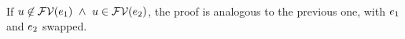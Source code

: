 \begin{bycase}
\begin{derivatioN}{4}
{ 
  \cup
   \cond{\varII\in\efvar{\exprI}}
        {\cup\cvarv{\exprI}{\varII}}
        {\emptyset}
    \cup\\
 \linK{=}
 \cond{\varII\neq\varI}
      {\cup{}}
      {\emptyset}
  \cup
   \cond{\varII\in\efvar{\exprI}}
        {\cup\cvarv{\exprI}{\varII}}
        {\emptyset}
 \linK{=}
 \cond{\varII\neq\varI}{\cvarv{\appO}{\varII}}{\emptyset}
  \cup
   \cond{\varII\in\efvar{\exprI}}
        {\cup\cvarv{\exprI}{\varII}}
        {\emptyset}
 \cond{\varII\neq\varI}{\cvarv{\appO}{\varII}}{\emptyset}
  \cup
   \cond{\varII\in\efvar{\exprI}}
        {\cup
         \cup
         \cvarv{\exprI}{\varII}}
        {\emptyset}
 \linK{=}
 \cond{\varII\neq\varI}{\cvarv{\appO}{\varII}}{\emptyset}
  \cup
   \cond{\varII\in\efvar{\exprI}}
        {\cvarv{\appO}{\varI}\cup\cvarv{\exprI}{\varII}}
        {\emptyset}}
\end{derivatioN}
If $u\not\in\mathcal{FV}(e_1)\ \wedge\ u\in\mathcal{FV}(e_2)$, the proof is
analogous to the previous one, with $e_1$ and $e_2$ swapped.


\end{bycase}
